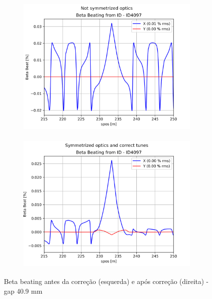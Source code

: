 \documentclass[a4paper,12pt]{article}
\begin{document}
\begin{figure}[H]
\begin{subfigure}{0.5\textwidth}
\includegraphics[width=0.9\linewidth, height=7cm]{figs/phase25 gap40 uncorrected-optics.png} 
\label{fig:subim12540}
\end{subfigure}
\begin{subfigure}{0.5\textwidth}
\includegraphics[width=0.9\linewidth, height=7cm]{figs/phase25 gap40 corrected-optics-tunes.png}
\label{fig:subim22540}
\end{subfigure}
\caption{Beta beating antes da correção (esquerda) e após correção (direita) - gap 40.9 mm}
\label{fig:bb25-40}
\end{figure}



     \nocite{*}
\end{document}
